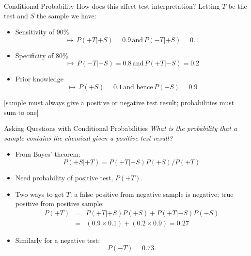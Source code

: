 \documentclass[aspectratio=169]{beamer}
\begin{document}
\begin{frame}{Conditional Probability}
  How does this affect test interpretation? Letting $T$ be the test and $S$ the sample we have:
  \begin{itemize}
    \item Sensitivity of 90\%
      \begin{equation*}
        \mapsto\, P(+T|+S) = 0.9\, \mbox{and}\, P(-T|+S)=0.1
      \end{equation*}
    \item Specificity of 80\%
      \begin{equation*}
        \, \mapsto\, P(-T|-S) = 0.8\, \mbox{and}\, P(+T|-S)=0.2
      \end{equation*}
    \item Prior knowledge
      \begin{equation*}
        \, \mapsto\, P(+S) = 0.1\, \mbox{and hence}\, P(-S)=0.9
      \end{equation*}
  \end{itemize}
  [sample must always give a positive or negative test result; probabilities must sum to one]
\end{frame}

\begin{frame}{Asking Questions with Conditional Probabilities}
  \textit{What is the probability that a sample contains the chemical given a positive test result?}
  \begin{itemize}
    \item From Bayes' theorem:
      \begin{equation*}
        P(+S|+T) = P(+T|+S)P(+S)/P(+T)
      \end{equation*}
    \item Need probability of positive test, $P(+T)$.
    \item Two ways to get $T$: a false positive from negative sample is negative; true positive from positive sample:
      \begin{eqnarray*}
        P(+T) &=& P(+T|+S)P(+S)+P(+T|-S)P(-S)\\  &=& (0.9\times0.1)+(0.2\times 0.9) = 0.27
      \end{eqnarray*}
      \item Similarly for a negative test:
        \begin{equation*}
          P(-T) = 0.73.
        \end{equation*}
  \end{itemize}
\end{frame}
\end{document}
